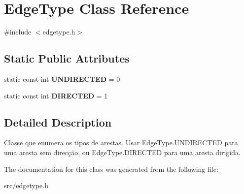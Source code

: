 \hypertarget{class_edge_type}{}\section{Edge\+Type Class Reference}
\label{class_edge_type}


{\ttfamily \#include $<$edgetype.\+h$>$}

\subsection*{Static Public Attributes}
\begin{DoxyCompactItemize}
\item 
static const int {\bfseries U\+N\+D\+I\+R\+E\+C\+T\+ED} = 0\hypertarget{class_edge_type_a6533cc56d05c288a550b9980b66c9317}{}\label{class_edge_type_a6533cc56d05c288a550b9980b66c9317}

\item 
static const int {\bfseries D\+I\+R\+E\+C\+T\+ED} = 1\hypertarget{class_edge_type_a903017a534f2818c2d17145e4ae0321c}{}\label{class_edge_type_a903017a534f2818c2d17145e4ae0321c}

\end{DoxyCompactItemize}


\subsection{Detailed Description}
Classe que enumera os tipos de arestas. Usar Edge\+Type.\+U\+N\+D\+I\+R\+E\+C\+T\+ED para uma aresta sem direcção, ou Edge\+Type.\+D\+I\+R\+E\+C\+T\+ED para uma aresta dirigida. 

The documentation for this class was generated from the following file\+:\begin{DoxyCompactItemize}
\item 
src/edgetype.\+h\end{DoxyCompactItemize}
